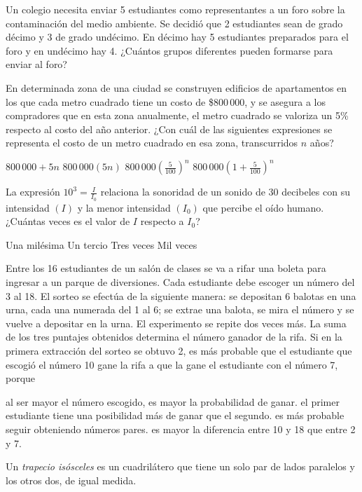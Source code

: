\documentclass[10pt,addpoints]{exam}
\begin{document}
\begin{questions}
\question Un colegio necesita enviar 5 estudiantes como representantes a un foro sobre la contaminación del medio ambiente. Se decidió que 2 estudiantes sean de grado décimo y 3 de grado undécimo. En décimo hay 5 estudiantes preparados para el foro y en undécimo hay 4. ¿Cuántos grupos diferentes pueden formarse para enviar al foro?

\begin{oneparchoices}
\end{oneparchoices}
\question En determinada zona de una ciudad se construyen edificios de apartamentos en los que cada metro cuadrado tiene un costo de \$800\,000, y se asegura a los compradores que en esta zona anualmente, el metro cuadrado se valoriza un 5\% respecto al costo del año anterior. ¿Con cu\'al de las siguientes expresiones se representa el costo de un metro cuadrado en esa zona, transcurridos $n$ años?
\begin{multicols}{2}
 \begin{choices}
  \choice $800\,000+5n$
  \choice $800\,000(5n)$
  \choice $800\,000\left(\frac{5}{100}\right)^{n}$
  \CorrectChoice $800\,000\left(1+\frac{5}{100}\right)^{n}$
 \end{choices}
\end{multicols}
\question La expresión $10^{3}=\frac{I}{I_{0}}$ relaciona la sonoridad de un sonido de 30 decibeles con su intensidad $(I)$ y la menor intensidad $(I_{0})$ que percibe el oído humano.
¿Cuántas veces es el valor de $I$ respecto a $I_{0}$?

\begin{oneparchoices}
 \choice Una milésima
 \choice Un tercio
 \choice Tres veces
 \CorrectChoice Mil veces
\end{oneparchoices}
\question Entre los 16 estudiantes de un salón de clases se va a rifar una boleta para ingresar a un parque de diversiones. Cada estudiante debe escoger un número del 3 al 18. El sorteo se efectúa de la siguiente manera: se depositan 6 balotas en una urna, cada una numerada del 1 al 6; se extrae una balota, se mira el número y se vuelve a depositar en la urna. El experimento se repite dos veces más. La suma de los tres puntajes obtenidos determina el número ganador de la rifa. Si en la primera extracción del sorteo se obtuvo 2, es más probable que el estudiante que escogió el número 10 gane la rifa a que la gane el estudiante con el número 7, porque
\begin{choices}
 \choice al ser mayor  el número escogido, es mayor la probabilidad de ganar.
 \choice el primer estudiante tiene una posibilidad más de ganar que el segundo.
 \choice es más probable seguir obteniendo números pares.
 \CorrectChoice es mayor la diferencia entre 10 y 18 que entre 2 y 7.
\end{choices}
\question Un \emph{trapecio isósceles} es un cuadrilátero que tiene un solo par de lados paralelos y los otros dos, de igual medida.


\end{questions}
\end{document}
